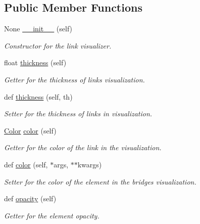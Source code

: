 \subsection*{Public Member Functions}
\begin{DoxyCompactItemize}
\item 
None \mbox{\hyperlink{classbridges_1_1link__visualizer_1_1_link_visualizer_a7cb9c24a43b43b22b26b6b03c85ccc85}{\+\_\+\+\_\+init\+\_\+\+\_\+}} (self)
\begin{DoxyCompactList}\small\item\em Constructor for the link visualizer\textquotesingle{}. \end{DoxyCompactList}\item 
float \mbox{\hyperlink{classbridges_1_1link__visualizer_1_1_link_visualizer_a17741aa4c8ca0ecb3333e4320ae8ccd8}{thickness}} (self)
\begin{DoxyCompactList}\small\item\em Getter for the thickness of links visualization. \end{DoxyCompactList}\item 
def \mbox{\hyperlink{classbridges_1_1link__visualizer_1_1_link_visualizer_af244bbe99885785f7dd3bb9460c1d21a}{thickness}} (self, th)
\begin{DoxyCompactList}\small\item\em Setter for the thickness of links in visualization. \end{DoxyCompactList}\item 
\mbox{\hyperlink{classbridges_1_1color_1_1_color}{Color}} \mbox{\hyperlink{classbridges_1_1link__visualizer_1_1_link_visualizer_a5b25e6b17996c74d84f0ca523564a6cc}{color}} (self)
\begin{DoxyCompactList}\small\item\em Getter for the color of the link in the visualization. \end{DoxyCompactList}\item 
def \mbox{\hyperlink{classbridges_1_1link__visualizer_1_1_link_visualizer_a5c0e2cc1b9c26bbc801f6e46b9b71ef0}{color}} (self, $\ast$args, $\ast$$\ast$kwargs)
\begin{DoxyCompactList}\small\item\em Setter for the color of the element in the bridges visualization. \end{DoxyCompactList}\item 
def \mbox{\hyperlink{classbridges_1_1link__visualizer_1_1_link_visualizer_a777892e054f00e8ef0291c5d41ce7f75}{opacity}} (self)
\begin{DoxyCompactList}\small\item\em Getter for the element opacity. \end{DoxyCompactList}\item 
$$
\end{DoxyCompactItemize}
